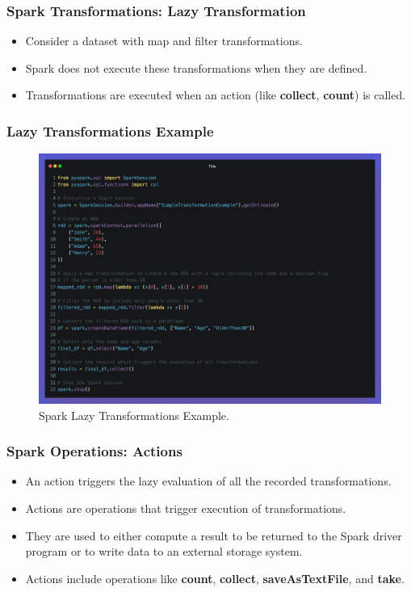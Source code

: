 \begin{frame}
  \frametitle{Spark Transformations: Lazy Transformation}
  \begin{itemize}
    \item Consider a dataset with map and filter transformations.
    \item Spark does not execute these transformations when they are defined.
    \item Transformations are executed when an action (like \textbf{collect}, \textbf{count}) is called.
  \end{itemize}
\end{frame}
\begin{frame}
    \frametitle{Lazy Transformations Example}
    \begin{figure}
        \includegraphics[width=\textwidth,height=.75\textheight,keepaspectratio]{./Figures/chapter-04/pyspark_transformations}
        \caption{Spark Lazy Transformations Example.}\label{fig:pyspark_transformations}
    \end{figure}
\end{frame}
\begin{frame}
    \frametitle{Spark Operations: Actions}
    \begin{itemize}
        \item An action triggers the lazy evaluation of all the recorded transformations.
        \item Actions are operations that trigger execution of transformations.
        \item They are used to either compute a result to be returned to the Spark driver program or to write data to an external storage system.
        \item Actions include operations like \textbf{count}, \textbf{collect}, \textbf{saveAsTextFile}, and \textbf{take}.
    \end{itemize}
\end{frame}

